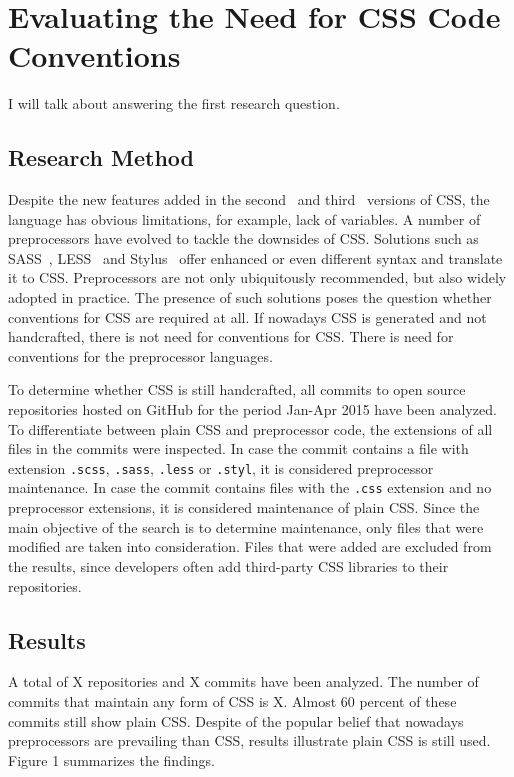 \documentclass[parskip=full]{uvamscse}
\begin{document}
\chapter{Evaluating the Need for CSS Code Conventions}

I will talk about answering the first research question.

\section{Research Method}

Despite the new features added in the second~\cite{CSS2} and third~\cite{CSS3} versions of CSS, the
language has obvious limitations, for example, lack of variables. A number of preprocessors have
evolved to tackle the downsides of CSS. Solutions such as SASS~\cite{SASS}, LESS~\cite{LESS} and
Stylus~\cite{Stylus} offer enhanced or even different syntax and translate it to CSS. Preprocessors
are not only ubiquitously recommended, but also widely adopted in practice. The presence of such
solutions poses the question whether conventions for CSS are required at all. If nowadays CSS is
generated and not handcrafted, there is not need for conventions for CSS. There is need for
conventions for the preprocessor languages.

To determine whether CSS is still handcrafted, all commits to open source repositories hosted on
GitHub for the period Jan-Apr 2015 have been analyzed. To differentiate between plain CSS and
preprocessor code, the extensions of all files in the commits were inspected. In case the commit
contains a file with extension \texttt{.scss}, \texttt{.sass}, \texttt{.less} or \texttt{.styl}, it
is considered preprocessor maintenance. In case the commit contains files with the \texttt{.css}
extension and no preprocessor extensions, it is considered maintenance of plain CSS. Since the main
objective of the search is to determine maintenance, only files that were modified are taken into
consideration. Files that were added are excluded from the results, since developers often add
third-party CSS libraries to their repositories.

\section{Results}

A total of X repositories and X commits have been analyzed. The number of commits that maintain any form of CSS is X. Almost 60 percent of these commits still show plain CSS. 
Despite of the popular belief that nowadays preprocessors are prevailing than CSS, results
illustrate plain CSS is still used. Figure 1 summarizes the findings.
\end{document}
